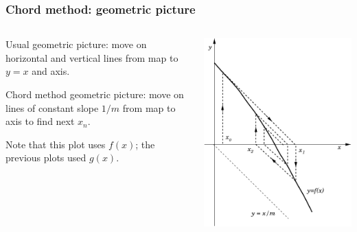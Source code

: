 \documentclass{beamer}
\begin{document}
\begin{frame}
  \frametitle{Chord method: geometric picture}

  \begin{columns}
    \begin{column}{0.5\textwidth}

      Usual geometric picture: move on horizontal and vertical lines from map to $y=x$ and axis.

      \vspace{2ex}

      Chord method geometric picture: move on lines of constant slope
      $1/m$ from map to axis to find next $x_n$.

      \vspace{2ex}

      Note that this plot uses $f(x)$; the previous plots used $g(x)$.
    \end{column}
    \begin{column}{0.5\textwidth}
      \begin{center}
        \includegraphics[width=\textwidth]{figures/chord}
      \end{center}
    \end{column}
  \end{columns}

\end{frame}
\end{document}
